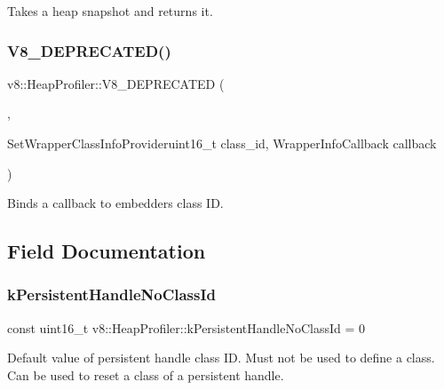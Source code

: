 Takes a heap snapshot and returns it. \mbox{\label{classv8_1_1HeapProfiler_af41ccd8baea0da8d701e565b7b2e8eab}} 
\subsubsection{\texorpdfstring{V8\+\_\+\+D\+E\+P\+R\+E\+C\+A\+T\+E\+D()}{V8\_DEPRECATED()}}
{\footnotesize\ttfamily v8\+::\+Heap\+Profiler\+::\+V8\+\_\+\+D\+E\+P\+R\+E\+C\+A\+T\+ED (\begin{DoxyParamCaption}\item[{\char`\"{}Use Add\+Build\+Embedder\+Graph\+Callback to provide info about embedder nodes\char`\"{}}]{,  }\item[{void }]{Set\+Wrapper\+Class\+Info\+Provideruint16\+\_\+t class\+\_\+id, Wrapper\+Info\+Callback callback }\end{DoxyParamCaption})}

Binds a callback to embedder\textquotesingle{}s class ID. 

\subsection{Field Documentation}
\mbox{\label{classv8_1_1HeapProfiler_a272c9af3ea5cd90a2737af3d22a7eb78}} 
\subsubsection{\texorpdfstring{k\+Persistent\+Handle\+No\+Class\+Id}{kPersistentHandleNoClassId}}
{\footnotesize\ttfamily const uint16\+\_\+t v8\+::\+Heap\+Profiler\+::k\+Persistent\+Handle\+No\+Class\+Id = 0\hspace{0.3cm}{\ttfamily [static]}}

Default value of persistent handle class ID. Must not be used to define a class. Can be used to reset a class of a persistent handle. \mbox{\label{classv8_1_1HeapProfiler_abf2b9d8facb18473f9b124ab8baf5786}} 
